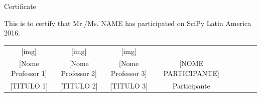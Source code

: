 \documentclass[12pt,a4paper,landscape]{article}
\begin{document}
\vspace*{5cm}

\begin{center}
  \Huge Certificate
\end{center}

This is to certify that Mr./Ms. NAME
has participated on SciPy Latin America 2016.

\vspace*{1cm}

\vspace*{1cm}
\hspace*{-2cm}
\begin{tabular}[linewidth=0]{cc|cc|cc|cc}
  [img] & 
  [img] & 
  [img] & 
  \\

  [Nome Professor 1] & 
  [Nome Professor 2] & 
  [Nome Professor 3] & 
  [NOME PARTICIPANTE]\\
  
  [TITULO 1] & 
  [TITULO 2] &
  [TITULO 3] &
  Participante
\end{tabular}
\end{document}
